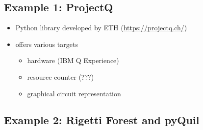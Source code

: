 \documentclass{beamer}
\begin{document}
\subsection{Example 1: ProjectQ}

\begin{frame}{\insertsection}{\insertsubsection}
	\begin{itemize}
        \item Python library developed by ETH (\url{https://projectq.ch/})
        \item offers various targets
        \begin{itemize}
            \item hardware (IBM Q Experience)
            \item resource counter (???)
            \item graphical circuit representation
        \end{itemize}
    \end{itemize}
\end{frame}

\begin{frame}{\insertsection}{\insertsubsection}
	
\end{frame}

\begin{frame}{\insertsection}{\insertsubsection}
	
\end{frame}

\begin{frame}{\insertsection}{\insertsubsection}
	
\end{frame}


\subsection{Example 2: Rigetti Forest and pyQuil}

\begin{frame}{\insertsection}{\insertsubsection}
	
\end{frame}
\end{document}

